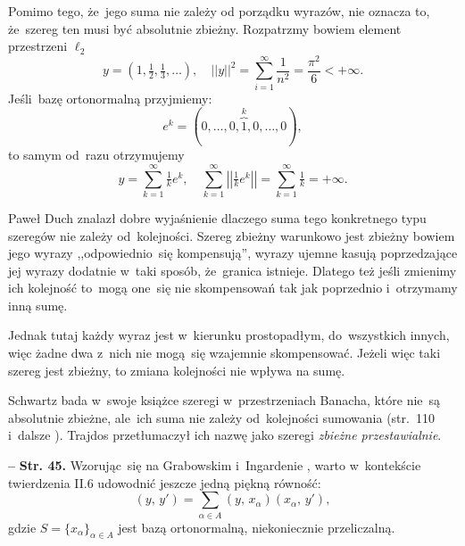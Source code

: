 \documentclass[a4paper,11pt]{article}
\newcommand{\spaceFour}{0.5em}
\newcommand{\ld}{\ldots}
\newcommand{\fr}{\frac}
\newcommand{\tfr}{\tfrac}
\newcommand{\al}{\alpha}
\newcommand{\Sum}{\sum\limits}
\newcommand{\norm}[1]{\left|\left| #1 \right|\right|}
\newcommand{\tb}{\textbf}
\newcommand{\noi}{\noindent}
\newcommand{\start}{\noi \tb{--} {}}
\newcommand{\Str}[1]{\tb{Str. #1.}}
\newcommand{\lcd}{\ell_{ 2 }} %
\newcommand{\SP}[2]{( #1, \, #2 )} %
\begin{document}
Pomimo tego, że~jego suma nie zależy od porządku wyrazów, nie oznacza
to, że~szereg ten musi być absolutnie zbieżny. Rozpatrzmy bowiem
element przestrzeni $\lcd$
\begin{equation*}
  y = ( 1, \tfr{ 1 }{ 2 }, \tfr{ 1 }{ 3 },\ld ), \quad
  \norm{ y }^{ 2 } = \Sum_{ i = 1 }^{ \infty } \fr{ 1 }{ n^{ 2 } }
  = \fr{ \pi^{ 2 } }{ 6 } < +\infty.
\end{equation*}
Jeśli~bazę ortonormalną przyjmiemy:
\begin{equation*}
  e^{ k } = ( 0, \ld, 0, \overbrace{ 1 }^{ k }, 0, \ld, 0),
\end{equation*}
to samym od~razu otrzymujemy
\begin{equation*}
  y = \Sum_{ k = 1 }^{ \infty } \tfr{ 1 }{ k } e^{ k }, \quad
  \Sum_{ k = 1 }^{ \infty } \norm{ \tfr{ 1 }{ k } e^{ k } }
  = \Sum_{ k = 1 }^{ \infty } \tfr{ 1 }{ k } = +\infty.
\end{equation*}

Paweł Duch znalazł dobre wyjaśnienie dlaczego suma tego konkretnego
typu szeregów nie zależy od~kolejności. Szereg zbieżny warunkowo jest
zbieżny bowiem jego wyrazy ,,odpowiednio~się kompensują'', wyrazy
ujemne kasują poprzedzające jej wyrazy dodatnie w~taki sposób,
że~granica istnieje. Dlatego też jeśli zmienimy ich kolejność to~mogą
one~się nie skompensowań tak jak poprzednio i~otrzymamy inną sumę.

Jednak tutaj każdy wyraz jest w~kierunku prostopadłym, do~wszystkich
innych, więc żadne dwa z~nich nie mogą~się wzajemnie skompensować.
Jeżeli więc taki szereg jest zbieżny, to zmiana kolejności nie wpływa
na sumę.

Schwartz bada w~swoje książce szeregi w~przestrzeniach Banacha, które
nie~są absolutnie zbieżne, ale~ich suma nie zależy od~kolejności
sumowania (str.~110 i~dalsze \cite{Schwartz79}). Trajdos przetłumaczył
ich nazwę jako szeregi \emph{zbieżne przestawialnie}. %

\vspace{\spaceFour}


\start \Str{45} Wzorując~się na Grabowskim i~Ingardenie
\cite{GrabowskiIngardenMechanikaKwantowa87}, warto w~kontekście
twierdzenia II.6 udowodnić jeszcze jedną piękną równość:
\begin{equation*}
  \SP{ y }{ y' } = \Sum_{ \al \in A } \SP{ y }{ x_{ \al } }
  \SP{ x_{ \al } }{ y' },
\end{equation*}
gdzie $S = \{ x_{ \al } \}_{ \al \in A }$ jest bazą ortonormalną,
niekoniecznie przeliczalną.
\end{document}
